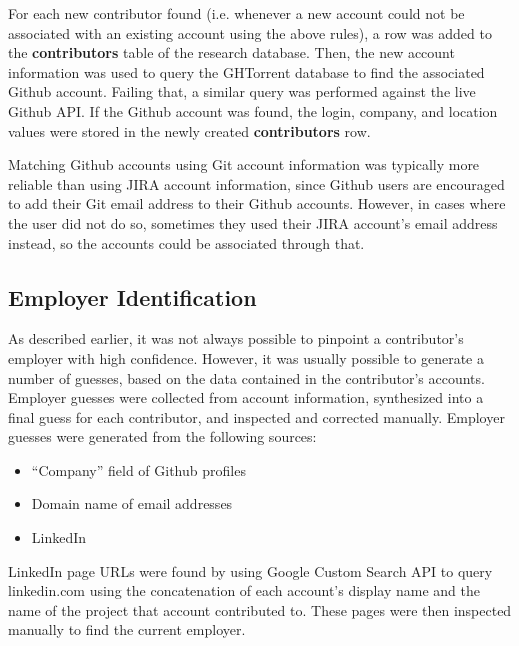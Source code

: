 For each new contributor found (i.e. whenever a new account could not be associated with an existing account using the above rules), a row was added to the \textbf{contributors} table of the research database. Then, the new account information was used to query the GHTorrent database to find the associated Github account. Failing that, a similar query was performed against the live Github API. If the Github account was found, the login, company, and location values were stored in the newly created \textbf{contributors} row.

Matching Github accounts using Git account information was typically more reliable than using JIRA account information, since Github users are encouraged to add their Git email address to their Github accounts. However, in cases where the user did not do so, sometimes they used their JIRA account's email address instead, so the accounts could be associated through that.
\subsection{Employer Identification}
As described earlier, it was not always possible to pinpoint a contributor's employer with high confidence. However, it was usually possible to generate a number of guesses, 
based on the data contained in the contributor's accounts. Employer guesses were collected from account information, synthesized into a final guess for each contributor, and inspected and corrected manually.
Employer guesses were generated from the following sources:
\begin{itemize}
	\item ``Company'' field of Github profiles
	\item Domain name of email addresses
	\item LinkedIn
\end{itemize}
LinkedIn page URLs were found by using Google Custom Search API to query linkedin.com using the concatenation of each account's display name and the name of the project that account contributed to. These pages were then inspected manually to find the current employer. 
